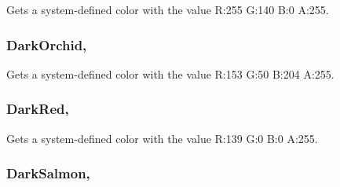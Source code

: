 Gets a system-\/defined color with the value R\+:255 G\+:140 B\+:0 A\+:255.

\hypertarget{structMicrosoft_1_1Xna_1_1Framework_1_1Color_a74f6f72dadaf4e2fe0b18f6d6fd2dc89}{}
\subsubsection[{Dark\+Orchid}]{ Dark\+Orchid\hspace{0.3cm}{\ttfamily [static]}, {\ttfamily [get]}}\label{structMicrosoft_1_1Xna_1_1Framework_1_1Color_a74f6f72dadaf4e2fe0b18f6d6fd2dc89}


Gets a system-\/defined color with the value R\+:153 G\+:50 B\+:204 A\+:255.

\hypertarget{structMicrosoft_1_1Xna_1_1Framework_1_1Color_a97617da30d2d878b9772b2272657164c}{}
\subsubsection[{Dark\+Red}]{ Dark\+Red\hspace{0.3cm}{\ttfamily [static]}, {\ttfamily [get]}}\label{structMicrosoft_1_1Xna_1_1Framework_1_1Color_a97617da30d2d878b9772b2272657164c}


Gets a system-\/defined color with the value R\+:139 G\+:0 B\+:0 A\+:255.

\hypertarget{structMicrosoft_1_1Xna_1_1Framework_1_1Color_a8d407cb14c2f02b24a29ab1f7e1b90f0}{}
\subsubsection[{Dark\+Salmon}]{ Dark\+Salmon\hspace{0.3cm}{\ttfamily [static]}, {\ttfamily [get]}}\label{structMicrosoft_1_1Xna_1_1Framework_1_1Color_a8d407cb14c2f02b24a29ab1f7e1b90f0}


